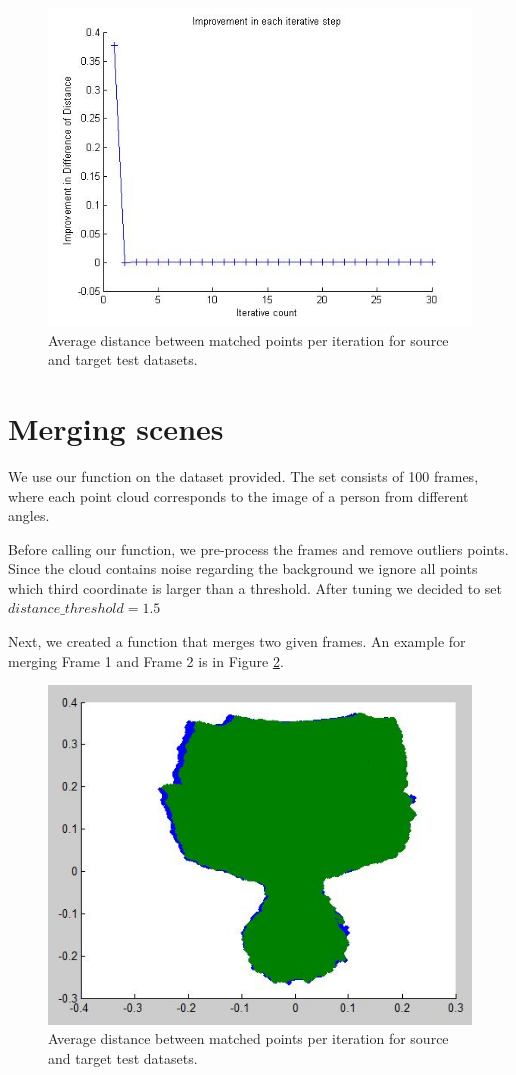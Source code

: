 \documentclass[11pt]{article}
\begin{document}
\begin{figure}[H]
	\centering
	\includegraphics[width=.5\textwidth]{img/test_performance.jpg}
	\caption{Average distance between matched points per iteration for source and target test datasets.}
	\label{fig:test_performance}
\end{figure}


\section{Merging scenes}
We use our function on the dataset provided. The set consists of 100 frames, where each point cloud corresponds to the image of a person from different angles.

Before calling our function, we pre-process the frames and remove outliers points. Since the cloud contains noise regarding the background we ignore all points which third coordinate is larger than a threshold. After tuning we decided to set $ distance\_threshold = 1.5 $

Next, we created a function that merges two given frames. An example for merging Frame 1 and Frame 2 is in Figure \ref{fig:simple_consecutive}. 

\begin{figure}[H]
	\centering
	\includegraphics[width=.5\textwidth]{img/consecutive_matched.jpg}
	\caption{Average distance between matched points per iteration for source and target test datasets.}
	\label{fig:simple_consecutive}
\end{figure}
\end{document}
